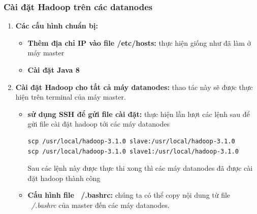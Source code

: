 		\subsubsection{Cài đặt Hadoop trên các datanodes}
		\begin{enumerate}
			\item \textbf{Các cấu hình chuẩn bị: }
			\begin{itemize}
				\item \textbf{Thêm địa chỉ IP vào file /etc/hosts: }thực hiện giống như đã làm ở máy master
				\item \textbf{Cài đặt Java 8}
			\end{itemize}
			\item \textbf{Cài đặt Hadoop cho tất cả máy datanodes: }thao tác này sẽ được thực hiện trên terminal của máy master.
			\begin{itemize}
				\item \textbf{sử dụng SSH để gửi file cài đặt: }thực hiện lần lượt các lệnh sau để gửi file cài đặt hadoop tới các máy datanodes
				\begin{lstlisting}
scp /usr/local/hadoop-3.1.0 slave:/usr/local/hadoop-3.1.0
scp /usr/local/hadoop-3.1.0 slave1:/usr/local/hadoop-3.1.0
				\end{lstlisting}
				Sau các lệnh này được thực thi xong thì các máy datanodes đã được cài đặt hadoop thành công
				\item \textbf{Cấu hình file ~/.bashrc: }chúng ta có thể copy nội dung từ file \textit{~/.bashrc} của master đến các máy datanodes.
			\end{itemize}
			

\end{enumerate}
